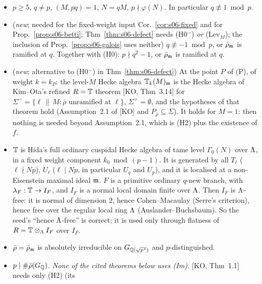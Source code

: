 \begin{hypothesis}\label{hyp:s06-H}
\leavevmode
\begin{itemize}
\item[(H0)] $p\ge5$, $q\ne p$, $(M,pq)=1$, $N=qM$, $p\nmid\varphi(N)$. In particular $q\not\equiv1\bmod p$.
\item[(H0$^-$)] (\emph{new}; needed for the fixed-weight input Cor.~\ref{cor:s06-fixed} and for Prop.~\ref{prop:s06-betti};
  Thm~\ref{thm:s06-defect} needs (H0$^-$) \emph{or} (Lev$_M$); the inclusion of Prop.~\ref{prop:s06-galois} uses neither)
  $q\not\equiv-1\bmod p$, or
  $\bar\rho_{\mathfrak{m}}$ is ramified at $q$. Together with (H0): $p\nmid q^2-1$, or $\bar\rho_{\mathfrak{m}}$ is ramified at $q$.
\item[(Lev$_M$)] (\emph{new}; alternative to (H0$^-$) in Thm~\ref{thm:s06-defect}) At the point $P$ of (P), of weight $k=k_P$:
  the level-$M$ Hecke algebra $\mathbb{T}_k(M)_{\mathfrak{m}}$ is the Hecke algebra of Kim--Ota's refined $R=\mathbb{T}$ theorem [KO, Thm~3.14]
   for $\Sigma^-=\{\ell\,\|\,M:\bar\rho\text{ unramified at }\ell\}$, $\Sigma^+=\emptyset$,
  and the hypotheses of that theorem hold (Assumption~2.1 of [KO] and $P_{\bar\rho}\subseteq\Sigma$). It holds for $M=1$: then
  nothing is needed beyond Assumption~2.1, which is (H2) plus the existence of $f$.
\item[(H1)] $\mathbb{T}$ is Hida's full ordinary cuspidal Hecke algebra of tame level $\Gamma_0(N)$ over $\Lambda$, in a fixed weight component
  $k_0\bmod(p-1)$. It is generated by all $T_\ell$ ($\ell\nmid Np$), $U_\ell$ ($\ell\mid Np$, in particular $U_q$ and $U_p$), and it
  is localised at a non-Eisenstein maximal ideal $\mathfrak{m}$. $F$ is a primitive ordinary $q$-new branch, with
  $\lambda_F:\mathbb{T}\to I_F$, and $I_F$ is a normal local domain finite over $\Lambda$. Then $I_F$ is $\Lambda$-free: it is normal of dimension $2$, hence
  Cohen--Macaulay (Serre's criterion), hence free over the regular local ring $\Lambda$ (Auslander--Buchsbaum). So the seed's
  ``hence $\Lambda$-free'' is correct; it is used only through flatness of $R=\mathbb{T}\otimes_\Lambda I_F$ over $I_F$.
\item[(H2)] $\bar\rho=\bar\rho_{\mathfrak{m}}$ is absolutely irreducible on $G_{\mathbb{Q}(\sqrt{p^*})}$ and $p$-distinguished.
\item[(Im)] $p\mid\#\bar\rho(G_{\mathbb{Q}})$. \emph{None of the cited theorems below uses (Im).} [KO, Thm~1.1] needs only (H2) (its

\end{itemize}
\end{hypothesis}
